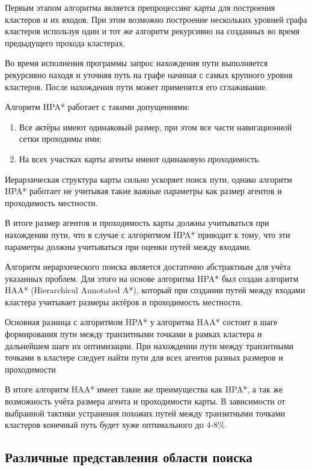 Первым этапом алгоритма является препроцессинг карты для построения кластеров и их входов. При этом возможно построение нескольких уровней графа кластеров используя один и тот же алгоритм рекурсивно на созданных во время предыдущего прохода кластерах.

Во время исполнения программы запрос нахождения пути выполняется рекурсивно находя и уточняя путь на графе начиная с самых крупного уровня кластеров. После нахождения пути может применятся его сглаживание.

Алгоритм HPA* работает с такими допущениями:

\begin{enumerate}
    \item Все актёры имеют одинаковый размер, при этом все части навигационной сетки проходимы ими;
    \item На всех участках карты агенты имеют одинаковую проходимость.
\end{enumerate}

Иерархическая структура карты сильно ускоряет поиск пути, однако алгоритм HPA* работает не учитывая такие важные параметры как размер агентов и проходимость местности.  

В итоге размер агентов и проходимость карты должны учитываться при нахождении пути, что в случае с алгоритмом HPA* приводит к тому, что эти параметры должны учитываться при оценки путей между входами.

Алгоритм иерархического поиска является достаточно абстрактным для учёта указанных проблем. Для этого на основе алгоритма HPA* был создан алгоритм HAA* (Hierarchical Annotated A*), который при создании путей между входами кластера учитывает размеры актёров и проходимость местности.

Основная разница с алгоритмом HPA* у алгоритма HAA* состоит в шаге формирования пути между транзитными точками в рамках кластера и дальнейшем шаге их оптимизации. При нахождении пути между транзитными точками в кластере следует найти пути для всех агентов разных размеров и проходимости 

В итоге алгоритм HAA* имеет такие же преимущества как HPA*, а так же возможность учёта размера агента и проходимости карты. В зависимости от выбранной тактики устранения похожих путей между транзитными точками кластеров конечный путь будет хуже оптимального до 4-8\%.

\subsection{Различные представления области поиска}

